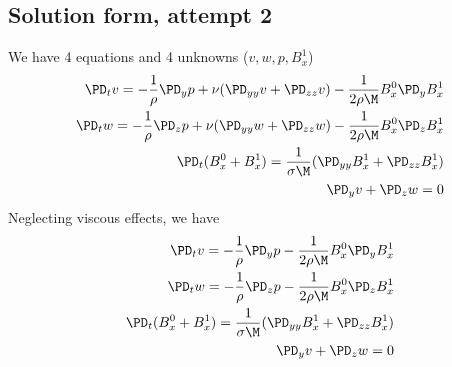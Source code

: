 \documentclass[11pt]{article}
\begin{document}
\subsection{Solution form, attempt 2}
We have 4 equations and 4 unknowns ($v,w,p,B_x^1$)
\begin{equation}\begin{aligned}
\PD_t v = -\frac{1}{\rho} \PD_y p + \nu (\PD_{yy} v+\PD_{zz} v) - \frac{1}{2\rho \M} B_x^0 \PD_y B_x^1 \\
\PD_t w = -\frac{1}{\rho} \PD_z p + \nu (\PD_{yy} w+\PD_{zz} w) - \frac{1}{2\rho \M} B_x^0 \PD_z B_x^1 \\
\PD_t (B_x^0+B_x^1) = \frac{1}{\sigma \M} (\PD_{yy} B_x^1+\PD_{zz} B_x^1) \\
\PD_y v + \PD_z w = 0 \\
\end{aligned} \end{equation}
Neglecting viscous effects, we have
\begin{equation}\begin{aligned}
\PD_t v = -\frac{1}{\rho} \PD_y p - \frac{1}{2\rho \M} B_x^0 \PD_y B_x^1 \\
\PD_t w = -\frac{1}{\rho} \PD_z p - \frac{1}{2\rho \M} B_x^0 \PD_z B_x^1 \\
\PD_t (B_x^0+B_x^1) = \frac{1}{\sigma \M} (\PD_{yy} B_x^1+\PD_{zz} B_x^1) \\
\PD_y v + \PD_z w = 0 \\
\end{aligned} \end{equation}
\end{document}
